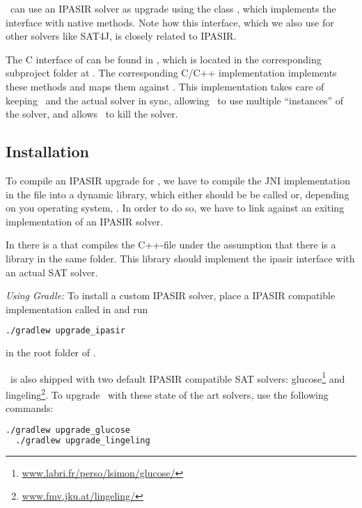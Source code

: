 \documentclass[a4paper, ukenglish, twoside, openright]{jdrasilmanual}
\begin{document}
\Jdrasil\ can use an IPASIR solver as upgrade using the class
, which implements the interface
 with native methods. Note how this
interface, which we also use for other solvers like SAT4J, is closely
related to IPASIR. 

The C interface of  can be found
in , which is
located in the corresponding subproject folder at . The
corresponding C/C++ implementation
 implements these methods and
maps them against . This implementation takes care of
keeping \Jdrasil\ and the actual solver in sync, allowing \Jdrasil\ to
use multiple ``instances'' of the solver, and allows \Jdrasil\ to kill
the solver. 

\subsection{Installation} 
To compile an IPASIR upgrade for \Jdrasil, we have to compile the JNI
implementation in the file 
into a dynamic library, which either should be be called
 or, depending on you
operating system,
. In order to do so, we
have to link against an exiting implementation of an IPASIR solver.

In  there is a  that
compiles the C++-file under the assumption that there is a library
 in the same folder. This library should
implement the ipasir interface with an actual SAT solver.

\emph{Using Gradle:} To install a custom IPASIR solver, place a IPASIR compatible
implementation called  in
 and run
\begin{lstlisting}[language=bash]
  ./gradlew upgrade_ipasir
\end{lstlisting}
in the root folder of \Jdrasil.

\Jdrasil\ is also shipped with two default IPASIR compatible SAT solvers:
glucose\footnote{\url{www.labri.fr/perso/lsimon/glucose/}} and lingeling\footnote{\url{www.fmv.jku.at/lingeling/}}. To upgrade \Jdrasil\ with these state of the
art solvers, use the following commands:
\begin{lstlisting}[language=bash]
  ./gradlew upgrade_glucose
  ./gradlew upgrade_lingeling
\end{lstlisting}
\end{document}
